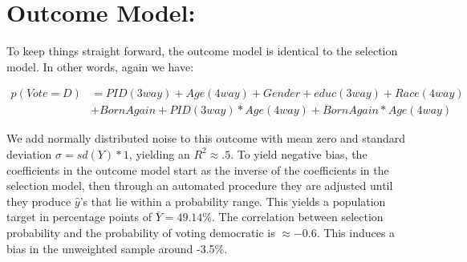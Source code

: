 \documentclass[
]{article}
\begin{document}
\hypertarget{outcome-model}{%
\section{Outcome Model:}\label{outcome-model}}

To keep things straight forward, the outcome model is identical to the
selection model. In other words, again we have:

\begin{align*}
p(Vote=D) &= PID(3way) + Age(4way)+ Gender + educ(3way) + Race(4way) \\
&+ BornAgain + PID(3way)*Age(4way) + BornAgain*Age(4way)
\end{align*}

We add normally distributed noise to this outcome with mean zero and
standard deviation \(\sigma = sd(Y)*1\), yielding an \(R^2\approx.5\).
To yield negative bias, the coefficients in the outcome model start as
the inverse of the coefficients in the selection model, then through an
automated procedure they are adjusted until they produce \(\hat{y}\)'s
that lie within a probability range. This yields a population target in
percentage points of \(\bar{Y} =49.14\%\). The correlation between
selection probability and the probability of voting democratic is
\(\approx -0.6\). This induces a bias in the unweighted sample around
-3.5\%.
\end{document}
